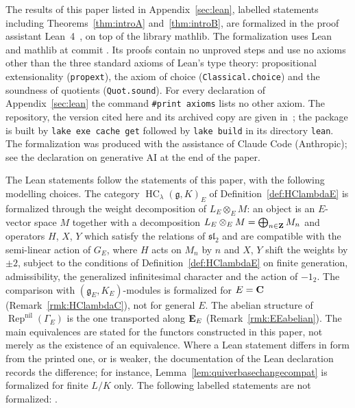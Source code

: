 \documentclass[a4paper,12pt,reqno]{amsart}
\newif\ifrqleanmarks
\newcommand{\rqleanglyph}{{\normalfont\sffamily\scriptsize[Lean]}}
\newcommand{\CC}{{\rm\bf C}}
\newcommand{\ZZ}{{\rm\bf Z}}
\newcommand{\EE}{{\rm\bf E}}
\DeclareMathOperator{\HC}{\mathrm{HC}}
\DeclareMathOperator{\Rep}{\mathrm{Rep}}
\theoremstyle{plain}
\theoremstyle{remark}
\begin{document}
The results of this paper listed in Appendix~\ref{sec:lean}, \rqleannumformalized{} labelled statements including Theorems~\ref{thm:introA} and~\ref{thm:introB}, are formalized in the proof assistant Lean~4~\cite{RQLean}, on top of the library mathlib.\ifrqleanmarks{} Each of them carries the mark~\rqleanglyph, which links to the corresponding Lean declaration.\fi{} The formalization uses Lean~\rqLeanToolchain{} and mathlib at commit \texttt{\rqMathlibCommitShort}. Its proofs contain no unproved steps and use no axioms other than the three standard axioms of Lean's type theory: propositional extensionality (\texttt{propext}), the axiom of choice (\texttt{Classical.choice}) and the soundness of quotients (\texttt{Quot.sound}). For every declaration of Appendix~\ref{sec:lean} the command \texttt{\#print axioms} lists no other axiom. The repository, the version cited here and its archived copy are given in~\cite{RQLean}; the package is built by \texttt{lake exe cache get} followed by \texttt{lake build} in its directory \texttt{lean}. The formalization was produced with the assistance of Claude Code (Anthropic); see the declaration on generative AI at the end of the paper.

The Lean statements follow the statements of this paper, with the following modelling choices. The category $\HC_\lambda(\mathfrak{g},K)_E$ of Definition~\ref{def:HClambdaE} is formalized through the weight decomposition of $L_E\otimes_E M$: an object is an $E$-vector space $M$ together with a decomposition $L_E\otimes_E M=\bigoplus_{n\in\ZZ}M_n$ and operators $H$, $X$, $Y$ which satisfy the relations of $\mathfrak{sl}_2$ and are compatible with the semi-linear action of $G_E$, where $H$ acts on $M_n$ by $n$ and $X$, $Y$ shift the weights by $\pm2$, subject to the conditions of Definition~\ref{def:HClambdaE} on finite generation, admissibility, the generalized infinitesimal character and the action of $-1_2$. The comparison with $(\mathfrak{g}_E,K_E)$-modules is formalized for $E=\CC$ (Remark~\ref{rmk:HClambdaC}), not for general $E$. The abelian structure of $\Rep^{\mathrm{nil}}(\Gamma_E)$ is the one transported along $\EE_E$ (Remark~\ref{rmk:EEabelian}). The main equivalences are stated for the functors constructed in this paper, not merely as the existence of an equivalence. Where a Lean statement differs in form from the printed one, or is weaker, the documentation of the Lean declaration records the difference; for instance, Lemma~\ref{lem:quiverbasechangecompat} is formalized for finite $L/K$ only. The following labelled statements are not formalized: \rqleanunformalized.
\end{document}
